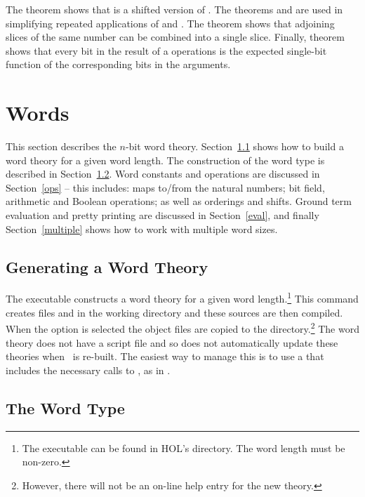\noindent The theorem  shows that  is a shifted version of .  The theorems  and  are used in simplifying repeated applications of  and .  The theorem  shows that adjoining slices of the same number can be combined into a single slice.  Finally, theorem  shows that every bit in the result of a  operations is the expected single-bit function of the corresponding bits in the arguments.

\section{Words}

This section describes the $n$-bit word theory.  Section~\ref{mkword} shows how to build a word theory for a given word length.  The construction of the word type is described in Section~\ref{type}.  Word constants and operations are discussed in Section~\ref{ops} -- this includes: maps to/from the natural numbers; bit field, arithmetic and Boolean operations; as well as orderings and shifts.
Ground term evaluation and pretty printing are discussed in Section~\ref{eval}, and finally Section~\ref{multiple} shows how to work with multiple word sizes.

\subsection{Generating a Word Theory} \label{mkword}

The executable  constructs a word theory for a given word length.\footnote{The executable can be found in HOL's  directory.  The word length must be non-zero.}  This command creates files  and  in the working directory and these sources are then compiled. When the  option is selected the object files are copied to the  directory.\footnote{
However, there will not be an on-line help entry for the new theory.}
The word theory does not have a script file and so  does not automatically update these theories \eg{} when \HOL\ is re-built.  The easiest way to manage this is to use a  that includes the necessary calls to , as in .

\subsection{The Word Type} \label{type}


